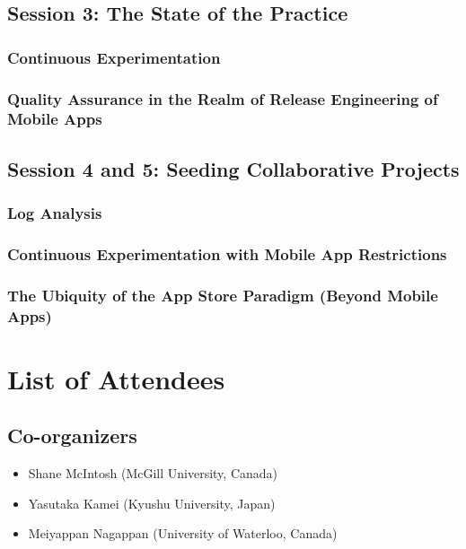 \documentclass[a4paper]{article}
\begin{document}
\subsection{Session 3: The State of the Practice}

\subsubsection{Continuous Experimentation}

\subsubsection{Quality Assurance in the Realm of Release Engineering of Mobile Apps}

\subsection{Session 4 and 5: Seeding Collaborative Projects}

\subsubsection{Log Analysis}

\subsubsection{Continuous Experimentation with Mobile App Restrictions}

\subsubsection{The Ubiquity of the App Store Paradigm (Beyond Mobile Apps)}

\clearpage

\section{List of Attendees}

\subsection{Co-organizers}

\begin{itemize}
\item Shane McIntosh (McGill University, Canada)
\item Yasutaka Kamei (Kyushu University, Japan)
\item Meiyappan Nagappan (University of Waterloo, Canada)
\end{itemize}
\end{document}
